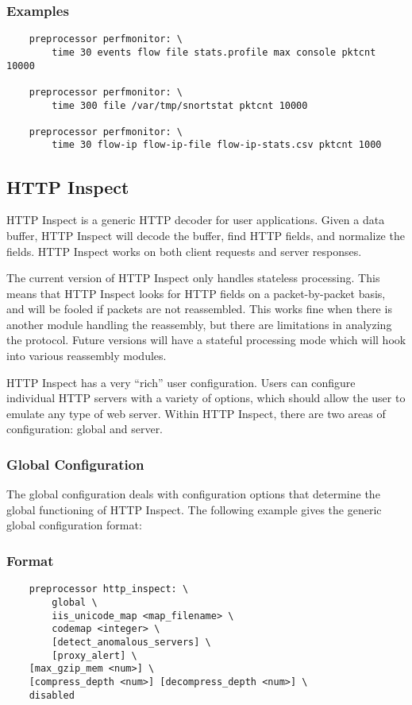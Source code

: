 \documentclass[english]{report}
\begin{document}
\subsubsection{Examples}

\begin{verbatim}
    preprocessor perfmonitor: \
        time 30 events flow file stats.profile max console pktcnt 10000 

    preprocessor perfmonitor: \
        time 300 file /var/tmp/snortstat pktcnt 10000

    preprocessor perfmonitor: \
        time 30 flow-ip flow-ip-file flow-ip-stats.csv pktcnt 1000
\end{verbatim}

\subsection{HTTP Inspect}
\label{sub:http-inspect}

HTTP Inspect is a generic HTTP decoder for user applications.  Given a data
buffer, HTTP Inspect will decode the buffer, find HTTP fields, and normalize
the fields.  HTTP Inspect works on both client requests and server responses.

The current version of HTTP Inspect only handles stateless processing.  This
means that HTTP Inspect looks for HTTP fields on a packet-by-packet basis, and
will be fooled if packets are not reassembled.  This works fine when there is
another module handling the reassembly, but there are limitations in analyzing
the protocol.  Future versions will have a stateful processing mode which will
hook into various reassembly modules.

HTTP Inspect has a very ``rich'' user configuration.  Users can configure
individual HTTP servers with a variety of options, which should allow the user
to emulate any type of web server. Within HTTP Inspect, there are two areas of
configuration: global and server.

\subsubsection{Global Configuration}

The global configuration deals with configuration options that determine the
global functioning of HTTP Inspect.  The following example gives the generic
global configuration format:

\subsubsection{Format}
\begin{verbatim}
    preprocessor http_inspect: \
        global \
        iis_unicode_map <map_filename> \
        codemap <integer> \
        [detect_anomalous_servers] \
        [proxy_alert] \
	[max_gzip_mem <num>] \
	[compress_depth <num>] [decompress_depth <num>] \
	disabled
\end{verbatim}
\end{document}

